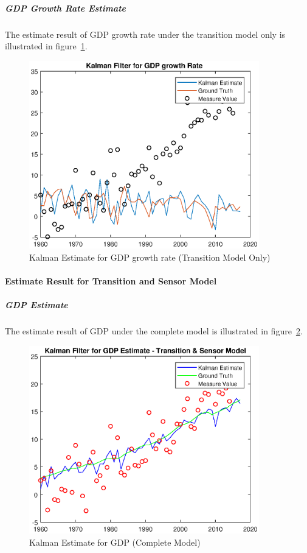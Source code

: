 \documentclass[11pt, a4paper]{article}
\begin{document}
\subparagraph{GDP Growth Rate Estimate}

The estimate result of GDP growth rate under the transition model only is illustrated in figure~\ref{fig:kf2}.

\begin{figure}[htbp]
	
	\centering 
	\includegraphics[width=10cm]{kf_1_2}
	
	\caption{Kalman Estimate for GDP growth rate (Transition Model Only)}
	\label{fig:kf2}
	
\end{figure}

\paragraph{Estimate Result for Transition and Sensor Model}

\subparagraph{GDP Estimate}

The estimate result of GDP under the complete model is illustrated in figure~\ref{fig:kf3}.

\begin{figure}[htbp]
	
	\centering 
	\includegraphics[width=10cm]{kf_1_3}
	
	\caption{Kalman Estimate for GDP (Complete Model)}
	\label{fig:kf3}
	
\end{figure}
\end{document}
